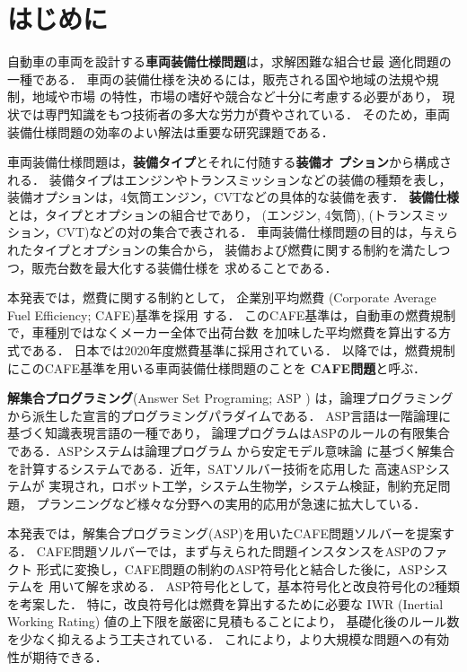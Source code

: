 \section{はじめに}
自動車の車両を設計する\textbf{車両装備仕様問題}は，求解困難な組合せ最
適化問題の一種である．
%
車両の装備仕様を決めるには，販売される国や地域の法規や規制，地域や市場
の特性，市場の嗜好や競合など十分に考慮する必要があり，
現状では専門知識をもつ技術者の多大な労力が費やされている．
そのため，車両装備仕様問題の効率のよい解法は重要な研究課題である．

車両装備仕様問題は，\textbf{装備タイプ}とそれに付随する\textbf{装備オ
プション}から構成される．
装備タイプはエンジンやトランスミッションなどの装備の種類を表し，
装備オプションは，4気筒エンジン，CVTなどの具体的な装備を表す．
%
\textbf{装備仕様}とは，タイプとオプションの組合せであり，
(エンジン, 4気筒), (トランスミッション，CVT)などの対の集合で表される．
車両装備仕様問題の目的は，与えられたタイプとオプションの集合から，
装備および燃費に関する制約を満たしつつ，販売台数を最大化する装備仕様を
求めることである．

本発表では，燃費に関する制約として，
企業別平均燃費 (Corporate Average Fuel Efficiency; CAFE)基準を採用
する．
このCAFE基準は，自動車の燃費規制で，車種別ではなくメーカー全体で出荷台数
を加味した平均燃費を算出する方式である．
日本では2020年度燃費基準に採用されている．
以降では，燃費規制にこのCAFE基準を用いる車両装備仕様問題のことを
\textbf{CAFE問題}と呼ぶ．



\textbf{解集合プログラミング}(Answer Set Programing; ASP \cite{%
  Baral03:cambridge,%
  Gelfond88:iclp,%
  Inoue08:jssst})
は，論理プログラミングから派生した宣言的プログラミングパラダイムである．
ASP言語は一階論理に基づく知識表現言語の一種であり，
論理プログラムはASPのルールの有限集合である．ASPシステムは論理プログラム
から安定モデル意味論 \cite{Gelfond88:iclp}
に基づく解集合を計算するシステムである．近年，SATソルバー技術を応用した
高速ASPシステムが
実現され，ロボット工学，システム生物学，システム検証，制約充足問題，
プランニングなど様々な分野への実用的応用が急速に拡大している\cite{%
Gelfond16:aim}．

本発表では，解集合プログラミング(ASP)を用いたCAFE問題ソルバーを提案する．
CAFE問題ソルバーでは，まず与えられた問題インスタンスをASPのファクト
形式に変換し，CAFE問題の制約のASP符号化と結合した後に，ASPシステムを
用いて解を求める．
ASP符号化として，基本符号化と改良符号化の2種類を考案した．
特に，改良符号化は燃費を算出するために必要な
IWR (Inertial Working Rating) 値の上下限を厳密に見積もることにより，
基礎化後のルール数を少なく抑えるよう工夫されている．
これにより，より大規模な問題への有効性が期待できる．

